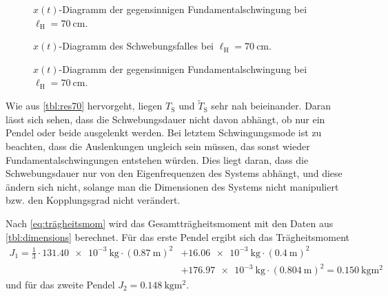 \documentclass[
12pt,
a4paper,
bibliography=totocnumbered, %
BCOR=1cm, %
oneside, %
]{scrartcl}
\newcommand{\lh}{\ell_{\mathrm{H}}}
\begin{document}
\begin{figure}[H]
	\caption{\(x(t)\)-Diagramm der gegensinnigen Fundamentalschwingung bei \(\lh = \qty{70}{\centi\meter}\).}
	\label{fig:geg70}
\end{figure}

\begin{figure}[H]
	\caption{\(x(t)\)-Diagramm des Schwebungsfalles bei \(\lh = \qty{70}{\centi\meter}\).}
	\label{fig:schweb}
\end{figure}

\begin{figure}[H]
	\caption{\(x(t)\)-Diagramm der gegensinnigen Fundamentalschwingung bei \(\lh = \qty{70}{\centi\meter}\).}
	\label{fig:ungl70}
\end{figure}

Wie aus \autoref{tbl:res70} hervorgeht, liegen \(T_{\text{S}}\) und \(\tilde{T}_{\text{S}}\) sehr nah beieinander. Daran lässt sich sehen, dass die Schwebungsdauer nicht davon abhängt, ob nur ein Pendel oder beide ausgelenkt werden. Bei letztem Schwingungsmode ist zu beachten, dass die Auslenkungen ungleich sein müssen, das sonst wieder Fundamentalschwingungen entstehen würden. Dies liegt daran, dass die Schwebungsdauer nur von den Eigenfrequenzen des Systems abhängt, und diese ändern sich nicht, solange man die Dimensionen des Systems nicht manipuliert bzw. den Kopplungsgrad nicht verändert.

%
%
%

Nach \autoref{eq:trägheitsmom} wird das Gesamtträgheitsmoment mit den Daten aus \autoref{tbl:dimensions} berechnet. Für das erste Pendel ergibt sich das Trägheitsmoment
\begin{equation*}
	\begin{split}
		J_1 = \frac{1}{3} \cdot \qty{131,40e-3}{\kilogram} \cdot (\qty{0,87}{\meter})^2 &+ \qty{16,06e-3}{\kilogram} \cdot (\qty{0,4}{\meter})^2
		\\&+ \qty{176,97e-3}{\kilogram} \cdot (\qty{0,804}{\meter})^2 = \qty{0,150}{\kilogram\meter\squared}
	\end{split}
\end{equation*}
und für das zweite Pendel \(J_2 = \qty{0,148}{\kilogram\meter\squared}\).
\end{document}
